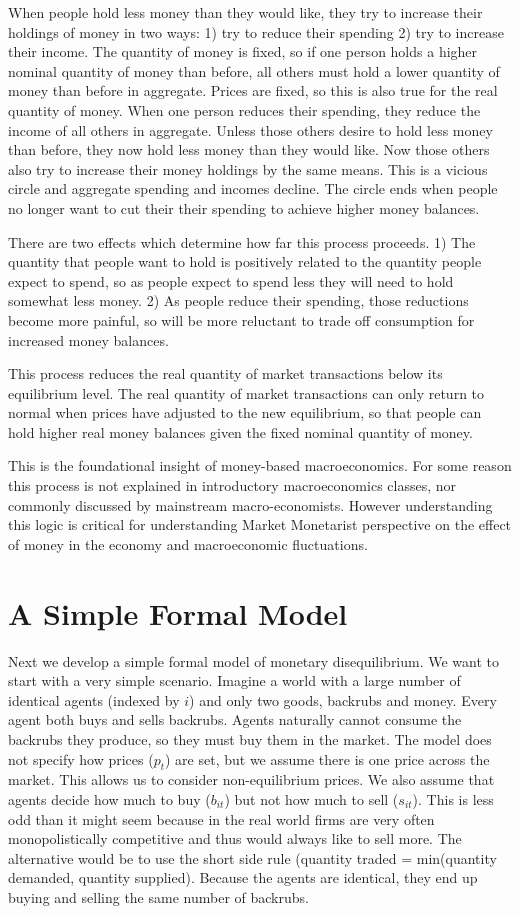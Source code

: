 \documentclass[14pt]{article} \usepackage{amsmath}
\begin{document}
When people hold less money than they would like, they try to increase their holdings of money in two ways: 1) try to reduce their spending 2) try to increase their income. The quantity of money is fixed, so if one person holds a higher nominal quantity of money than before, all others must hold a lower quantity of money than before in aggregate. Prices are fixed, so this is also true for the real quantity of money. When one person reduces their spending, they reduce the income of all others in aggregate. Unless those others desire to hold less money than before, they now hold less money than they would like. Now those others also try to increase their money holdings by the same means. This is a vicious circle and aggregate spending and incomes decline. The circle ends when people no longer want to cut their their spending to achieve higher money balances.

There are two effects which determine how far this process proceeds. 1) The quantity that people want to hold is positively related to the quantity people expect to spend, so as people expect to spend less they will need to hold somewhat less money. 2) As people reduce their spending, those reductions become more painful, so will be more reluctant to trade off consumption for increased money balances.

This process reduces the real quantity of market transactions below its equilibrium level. The real quantity of market transactions can only return to normal when prices have adjusted to the new equilibrium, so that people can hold higher real money balances given the fixed nominal quantity of money.

This is the foundational insight of money-based macroeconomics. For some reason this process is not explained in introductory macroeconomics classes, nor commonly discussed by mainstream macro-economists. However understanding this logic is critical for understanding Market Monetarist perspective on the effect of money in the economy and macroeconomic fluctuations.

\section{A Simple Formal Model}
Next we develop a simple formal model of monetary disequilibrium. We want to start with a very simple scenario. Imagine a world with a large number of identical agents (indexed by $i$) and only two goods, backrubs and money. Every agent both buys and sells backrubs. Agents naturally cannot consume the backrubs they produce, so they must buy them in the market. The model does not specify how prices ($p_t$) are set, but we assume there is one price across the market. This allows us to consider non-equilibrium prices. We also assume that agents decide how much to buy ($b_{it}$) but not how much to sell ($s_{it}$). This is less odd than it might seem because in the real world firms are very often monopolistically competitive and thus would always like to sell more. The alternative would be to use the short side rule (quantity traded = min(quantity demanded, quantity supplied). Because the agents are identical, they end up buying and selling the same number of backrubs.
\end{document}
